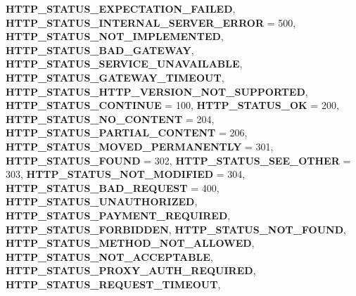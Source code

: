 \begin{DoxyCompactItemize}
{\bfseries H\+T\+T\+P\+\_\+\+S\+T\+A\+T\+U\+S\+\_\+\+E\+X\+P\+E\+C\+T\+A\+T\+I\+O\+N\+\_\+\+F\+A\+I\+L\+ED}, 
\newline
{\bfseries H\+T\+T\+P\+\_\+\+S\+T\+A\+T\+U\+S\+\_\+\+I\+N\+T\+E\+R\+N\+A\+L\+\_\+\+S\+E\+R\+V\+E\+R\+\_\+\+E\+R\+R\+OR} = 500, 
{\bfseries H\+T\+T\+P\+\_\+\+S\+T\+A\+T\+U\+S\+\_\+\+N\+O\+T\+\_\+\+I\+M\+P\+L\+E\+M\+E\+N\+T\+ED}, 
{\bfseries H\+T\+T\+P\+\_\+\+S\+T\+A\+T\+U\+S\+\_\+\+B\+A\+D\+\_\+\+G\+A\+T\+E\+W\+AY}, 
{\bfseries H\+T\+T\+P\+\_\+\+S\+T\+A\+T\+U\+S\+\_\+\+S\+E\+R\+V\+I\+C\+E\+\_\+\+U\+N\+A\+V\+A\+I\+L\+A\+B\+LE}, 
\newline
{\bfseries H\+T\+T\+P\+\_\+\+S\+T\+A\+T\+U\+S\+\_\+\+G\+A\+T\+E\+W\+A\+Y\+\_\+\+T\+I\+M\+E\+O\+UT}, 
{\bfseries H\+T\+T\+P\+\_\+\+S\+T\+A\+T\+U\+S\+\_\+\+H\+T\+T\+P\+\_\+\+V\+E\+R\+S\+I\+O\+N\+\_\+\+N\+O\+T\+\_\+\+S\+U\+P\+P\+O\+R\+T\+ED}, 
{\bfseries H\+T\+T\+P\+\_\+\+S\+T\+A\+T\+U\+S\+\_\+\+C\+O\+N\+T\+I\+N\+UE} = 100, 
{\bfseries H\+T\+T\+P\+\_\+\+S\+T\+A\+T\+U\+S\+\_\+\+OK} = 200, 
\newline
{\bfseries H\+T\+T\+P\+\_\+\+S\+T\+A\+T\+U\+S\+\_\+\+N\+O\+\_\+\+C\+O\+N\+T\+E\+NT} = 204, 
{\bfseries H\+T\+T\+P\+\_\+\+S\+T\+A\+T\+U\+S\+\_\+\+P\+A\+R\+T\+I\+A\+L\+\_\+\+C\+O\+N\+T\+E\+NT} = 206, 
{\bfseries H\+T\+T\+P\+\_\+\+S\+T\+A\+T\+U\+S\+\_\+\+M\+O\+V\+E\+D\+\_\+\+P\+E\+R\+M\+A\+N\+E\+N\+T\+LY} = 301, 
{\bfseries H\+T\+T\+P\+\_\+\+S\+T\+A\+T\+U\+S\+\_\+\+F\+O\+U\+ND} = 302, 
\newline
{\bfseries H\+T\+T\+P\+\_\+\+S\+T\+A\+T\+U\+S\+\_\+\+S\+E\+E\+\_\+\+O\+T\+H\+ER} = 303, 
{\bfseries H\+T\+T\+P\+\_\+\+S\+T\+A\+T\+U\+S\+\_\+\+N\+O\+T\+\_\+\+M\+O\+D\+I\+F\+I\+ED} = 304, 
{\bfseries H\+T\+T\+P\+\_\+\+S\+T\+A\+T\+U\+S\+\_\+\+B\+A\+D\+\_\+\+R\+E\+Q\+U\+E\+ST} = 400, 
{\bfseries H\+T\+T\+P\+\_\+\+S\+T\+A\+T\+U\+S\+\_\+\+U\+N\+A\+U\+T\+H\+O\+R\+I\+Z\+ED}, 
\newline
{\bfseries H\+T\+T\+P\+\_\+\+S\+T\+A\+T\+U\+S\+\_\+\+P\+A\+Y\+M\+E\+N\+T\+\_\+\+R\+E\+Q\+U\+I\+R\+ED}, 
{\bfseries H\+T\+T\+P\+\_\+\+S\+T\+A\+T\+U\+S\+\_\+\+F\+O\+R\+B\+I\+D\+D\+EN}, 
{\bfseries H\+T\+T\+P\+\_\+\+S\+T\+A\+T\+U\+S\+\_\+\+N\+O\+T\+\_\+\+F\+O\+U\+ND}, 
{\bfseries H\+T\+T\+P\+\_\+\+S\+T\+A\+T\+U\+S\+\_\+\+M\+E\+T\+H\+O\+D\+\_\+\+N\+O\+T\+\_\+\+A\+L\+L\+O\+W\+ED}, 
\newline
{\bfseries H\+T\+T\+P\+\_\+\+S\+T\+A\+T\+U\+S\+\_\+\+N\+O\+T\+\_\+\+A\+C\+C\+E\+P\+T\+A\+B\+LE}, 
{\bfseries H\+T\+T\+P\+\_\+\+S\+T\+A\+T\+U\+S\+\_\+\+P\+R\+O\+X\+Y\+\_\+\+A\+U\+T\+H\+\_\+\+R\+E\+Q\+U\+I\+R\+ED}, 
{\bfseries H\+T\+T\+P\+\_\+\+S\+T\+A\+T\+U\+S\+\_\+\+R\+E\+Q\+U\+E\+S\+T\+\_\+\+T\+I\+M\+E\+O\+UT}, 

\end{DoxyCompactItemize}
